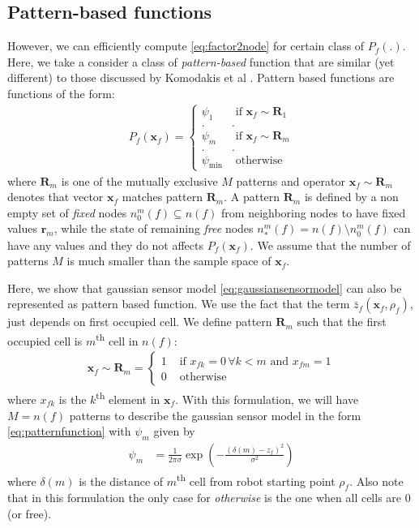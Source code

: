 \documentclass[letterpaper, 10 pt, conference]{ieeeconf} %
\newcommand{\vect}[1]{\mathbf{#1}}
\begin{document}
\subsection{Pattern-based functions}
\label{sec:patternfunctions}
However, we can efficiently compute \eqref{eq:factor2node} for certain class of
$P_f(.)$. Here, we take a consider a class of \emph{pattern-based} function
that are similar (yet different) to those discussed by Komodakis et al
\cite{komodakis2009beyond}. Pattern based functions are functions of the form:
\begin{align}
  P_f(\vect{x}_f) = \begin{cases}
    \psi_{1} & \text{ if $\vect{x}_f \sim \vect{R}_1$}\\
            .&.\\
    \psi_{m} & \text{ if $\vect{x}_f \sim \vect{R}_m$}\\
            .&.\\
    \psi_{\text{min}} & \text{ otherwise}
  \end{cases}
  \label{eq:patternfunction}
\end{align}
where $\vect{R}_m$ is one of the mutually exclusive $M$ patterns and operator
$\vect{x}_f \sim \vect{R}_m$ denotes that vector $\vect{x}_f$ matches pattern
$\vect{R}_m$.  
A pattern $\vect{R}_m$ is defined by a non empty set of \emph{fixed} nodes
$n^m_0(f) \subseteq n(f)$ from neighboring nodes to have fixed values $\vect{r}_m$, 
while the state of remaining \emph{free} nodes $n^m_*(f) = n(f) \setminus
n^m_0(f)$ can have any values and they do not affects $P_f(\vect{x}_f)$.
We assume that the number
of patterns $M$ is much smaller than the sample space of $\vect{x}_f$.

Here, we show that gaussian sensor
model \eqref{eq:gaussiansensormodel} can also be represented as pattern based function. 
We use the fact that the term $\bar{z}_f(\vect{x}_f, \rho_f)$, just depends on
first occupied cell. We define pattern $\vect{R}_m$ such that the first
occupied cell is $m$\textsuperscript{th} cell in $n(f)$:
\begin{align}
  \vect{x}_f \sim \vect{R}_m = \begin{cases}
    1 & \text{ if $x_{fk} = 0 \, \forall k < m$ and $x_{fm} = 1$}\\
    0 & \text{ otherwise}
  \end{cases}
\end{align}
where $x_{fk}$ is the $k$\textsuperscript{th} element in $\vect{x}_f$. With
this formulation, we will have $M = n(f)$ patterns to describe the gaussian
sensor model in the form \eqref{eq:patternfunction} with $\psi_m$ given by
\begin{align}
  \psi_m &= \frac{1}{2\pi\sigma}\exp\left(-\frac{(\delta(m)- z_f)^2}{\sigma^2}\right)
\end{align}
where $\delta(m)$ is the distance of $m$\textsuperscript{th} cell from robot
starting point $\rho_f$. Also note that in this formulation the only case for
\emph{otherwise} is the one when all cells are $0$ (or free).
\end{document}
